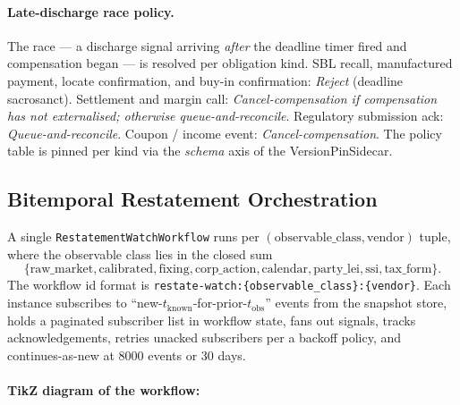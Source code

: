 \documentclass[11pt,a4paper]{article}
\begin{document}
\paragraph{Late-discharge race policy.} The race --- a discharge signal arriving \emph{after} the deadline timer fired and compensation began --- is resolved per obligation kind. SBL recall, manufactured payment, locate confirmation, and buy-in confirmation: \emph{Reject} (deadline sacrosanct). Settlement and margin call: \emph{Cancel-compensation if compensation has not externalised; otherwise queue-and-reconcile}. Regulatory submission ack: \emph{Queue-and-reconcile}. Coupon / income event: \emph{Cancel-compensation}. The policy table is pinned per kind via the \emph{schema} axis of the VersionPinSidecar.

\subsection{Bitemporal Restatement Orchestration}
\label{sec:operational-restatement}

A single \texttt{RestatementWatchWorkflow} runs per $(\text{observable\_class}, \text{vendor})$ tuple, where the observable class lies in the closed sum
\[
\{\text{raw\_market}, \text{calibrated}, \text{fixing}, \text{corp\_action}, \text{calendar}, \text{party\_lei}, \text{ssi}, \text{tax\_form}\}.
\]
The workflow id format is \texttt{restate-watch:\{observable\_class\}:\{vendor\}}. Each instance subscribes to ``new-$t_{\mathrm{known}}$-for-prior-$t_{\mathrm{obs}}$'' events from the snapshot store, holds a paginated subscriber list in workflow state, fans out signals, tracks acknowledgements, retries unacked subscribers per a backoff policy, and continues-as-new at 8000 events or 30 days.

\paragraph{TikZ diagram of the workflow:}
\end{document}

